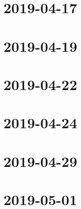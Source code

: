 \documentclass{ccg-notes}
\author{Colton Grainger}
\date{\today}
\begin{document}
\frontstuff

\section{2019-04-17}
    

\section{2019-04-19}
    

\section{2019-04-22}
    

\section{2019-04-24}
    

\section{2019-04-29}
    

\section{2019-05-01}
    
\end{document}
